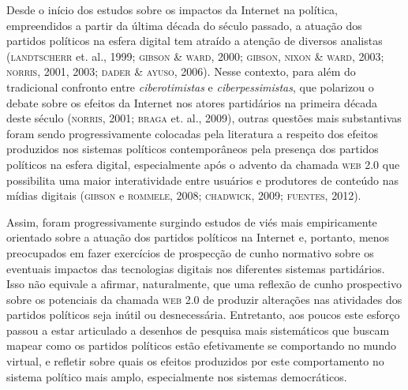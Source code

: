 \noindent{}Desde o início dos estudos sobre os impactos da Internet na política,
empreendidos a partir da última década do século passado, a atuação dos
partidos políticos na esfera digital tem atraído a atenção de diversos
analistas (\textsc{landtscherr} et. al., 1999; \textsc{gibson} \& \textsc{ward}, 2000; \textsc{gibson},
\textsc{nixon} \& \textsc{ward}, 2003; \textsc{norris}, 2001, 2003; \textsc{dader} \& \textsc{ayuso}, 2006). Nesse
contexto, para além do tradicional confronto entre \textit{ciberotimistas} e
\textit{ciberpessimistas}, que polarizou o debate sobre os efeitos da
Internet nos atores partidários na primeira década deste século (\textsc{norris},
2001; \textsc{braga} et. al., 2009), outras questões mais substantivas foram
sendo progressivamente colocadas pela literatura a respeito dos efeitos
produzidos nos sistemas políticos contemporâneos pela presença dos
partidos políticos na esfera digital, especialmente após o advento da
chamada \textsc{web 2.0} que possibilita uma maior interatividade entre
usuários e produtores de conteúdo nas mídias digitais (\textsc{gibson} e \textsc{rommele},
2008; \textsc{chadwick}, 2009; \textsc{fuentes}, 2012).

Assim, foram progressivamente surgindo estudos de viés mais
empiricamente orientado sobre a atuação dos partidos políticos na
Internet e, portanto, menos preocupados em fazer exercícios de
prospecção de cunho normativo sobre os eventuais impactos das
tecnologias digitais nos diferentes sistemas partidários. Isso não
equivale a afirmar, naturalmente, que uma reflexão de cunho prospectivo
sobre os potenciais da chamada \textsc{web 2.0} de produzir alterações nas
atividades dos partidos políticos seja inútil ou desnecessária.
Entretanto, aos poucos este esforço passou a estar articulado a desenhos
de pesquisa mais sistemáticos que buscam mapear como os partidos
políticos estão efetivamente se comportando no mundo virtual, e refletir
sobre quais os efeitos produzidos por este comportamento no sistema
político mais amplo, especialmente nos sistemas democráticos.

